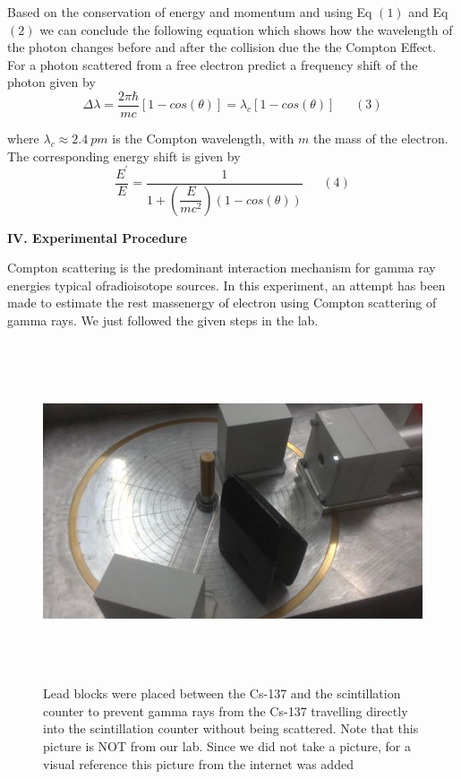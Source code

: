 \documentclass[fleqn]{article}
\begin{document}
  \vspace{15px}

  Based on the conservation of energy and momentum and using Eq $(1)$ and Eq $(2)$ we can conclude the following equation which shows
  how the wavelength of the photon changes before and after the collision due the the Compton Effect. For a photon scattered from
  a free electron predict a frequency shift of the photon given by
  $$\Delta \lambda=\dfrac{2 \pi \hbar}{mc} \left[1-cos(\theta)\right]=\lambda_c \left[1-cos(\theta)\right]  ~~~~~~~ (3)$$

  where $\lambda_c \approx 2.4 ~ pm$ is the Compton wavelength, with $m$ the mass of the electron. The corresponding energy shift is given by
  $$\dfrac{E^'}{E}=\dfrac{1}{1+\left(\dfrac{E}{mc^2}\right)\left(1-cos (\theta)\right)} ~~~~~~~ (4)$$

  \vspace{10px}

  \textbf{IV. Experimental Procedure}

  \vspace{10px}

  Compton scattering is the predominant interaction mechanism for gamma ray energies typical ofradioisotope sources. 
  In this experiment, an attempt has been made to estimate the rest massenergy of electron using Compton scattering of gamma rays. 
  We just followed the given steps in the lab.


  \begin{figure}[htbp]
    \includegraphics[height=10cm, width=15cm]{Two.JPG}
    \caption{
      Lead blocks were placed between the Cs-137 and the scintillation counter to prevent gamma rays from the
      Cs-137 travelling directly into the scintillation counter without being scattered. Note that this picture is NOT
      from our lab. Since we did not take a picture, for a visual reference this picture from the internet was added
    }
  \end{figure}
\end{document}
